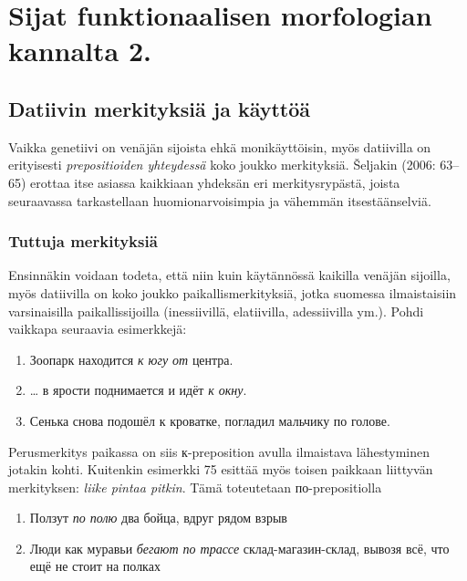 \documentclass[]{scrreprt}
\providecommand{\tightlist}{%
  \setlength{\itemsep}{0pt}\setlength{\parskip}{0pt}}
\begin{document}
\chapter{Sijat funktionaalisen morfologian kannalta
2.}\label{luento-8-sijat-funktionaalisen-morfologian-kannalta-2.}


\section{Datiivin merkityksiä ja
käyttöä}\label{datiivin-merkityksiuxe4-ja-kuxe4yttuxf6uxe4}

Vaikka genetiivi on venäjän sijoista ehkä monikäyttöisin, myös
datiivilla on erityisesti \emph{prepositioiden yhteydessä} koko joukko
merkityksiä. Šeljakin (2006: 63--65) erottaa itse asiassa kaikkiaan
yhdeksän eri merkitysrypästä, joista seuraavassa tarkastellaan
huomionarvoisimpia ja vähemmän itsestäänselviä.

\subsection{Tuttuja merkityksiä}\label{tuttuja-merkityksiuxe4}

Ensinnäkin voidaan todeta, että niin kuin käytännössä kaikilla venäjän
sijoilla, myös datiivilla on koko joukko paikallismerkityksiä, jotka
suomessa ilmaistaisiin varsinaisilla paikallissijoilla (inessiivillä,
elatiivilla, adessiivilla ym.). Pohdi vaikkapa seuraavia esimerkkejä:

\begin{enumerate}
\def\labelenumi{(\arabic{enumi})}
\setcounter{enumi}{72}
\tightlist
\item
  Зоопарк находится \emph{к югу от} центра.
\item
  \ldots{} в ярости поднимается и идёт \emph{к окну}.
\item
  Сенька снова подошёл к кроватке, погладил мальчику по голове.
\end{enumerate}

Perusmerkitys paikassa on siis к-preposition avulla ilmaistava
lähestyminen jotakin kohti. Kuitenkin esimerkki 75 esittää myös toisen
paikkaan liittyvän merkityksen: \emph{liike pintaa pitkin}. Tämä
toteutetaan по-prepositiolla

\begin{enumerate}
\def\labelenumi{(\arabic{enumi})}
\setcounter{enumi}{75}
\tightlist
\item
  Ползут \emph{по полю} два бойца, вдруг рядом взрыв
\item
  Люди как муравьи \emph{бегают по трассе} склад-магазин-склад, вывозя
  всё, что ещё не стоит на полках
\end{enumerate}
\end{document}

